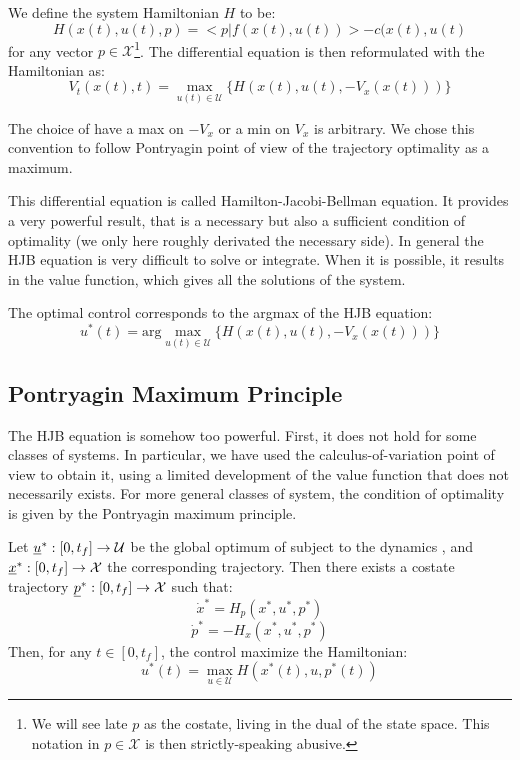 \documentclass{book}
\begin{document}
We define the system Hamiltonian $H$ to be:
$$H(x(t),u(t),p) = <p | f(x(t),u(t))> - c(x(t),u(t)$$
for any vector $p \in \mathcal{X}$\footnote{We will see late $p$ as the costate, living in the dual of the state space. This notation in $p \in \mathcal{X}$ is then strictly-speaking abusive.}. The differential equation is then reformulated with the Hamiltonian as:
$$ V_t(x(t),t) = \max_{u(t) \in \mathcal{U}} \Big\{ H(x(t),u(t),-V_x(x(t))) \Big\} $$

The choice of have a max on $-V_x$ or a min on $V_x$ is arbitrary. We chose this convention to follow Pontryagin point of view of the trajectory optimality as a maximum.

This differential equation is called Hamilton-Jacobi-Bellman equation. It provides a very powerful result, that is a necessary but also a sufficient condition of optimality (we only here roughly derivated the necessary side). In general the HJB equation is very difficult to solve or integrate. When it is possible, it results in the value function, which gives all the solutions of the system.

The optimal control corresponds to the argmax of the HJB equation:
$$ u^*(t) = \textrm{arg}\max_{u(t) \in \mathcal{U}} \Big\{ H(x(t),u(t),-V_x(x(t))) \Big\} $$

\subsection{Pontryagin Maximum Principle}

The HJB equation is somehow too powerful. First, it does not hold for some classes of systems. In particular, we have used the calculus-of-variation point of view to obtain it, using a limited development of the value function that does not necessarily exists. For more general classes of system, the condition of optimality is given by the Pontryagin maximum principle.

\begin{theorem}
Let $\underline{u}^* : [0,t_f] \rightarrow \mathcal U$ be the global optimum of  subject to the dynamics , and $\underline{x}^* : [0,t_f] \rightarrow \mathcal X$ the corresponding trajectory. Then there exists a costate trajectory $\underline{p}^* : [0,t_f] \rightarrow \mathcal X$ such that:
$$ \dot x^* = H_p (x^*,u^*,p^*) $$ 
$$ \dot p^* = - H_x (x^*,u^*,p^*) $$ 
Then, for any $t \in [0,t_f]$, the control maximize the Hamiltonian:
$$ u^*(t) = \max_{u \in \mathcal{U} } H(x^*(t),u,p^*(t))$$
\end{theorem}
\end{document}

